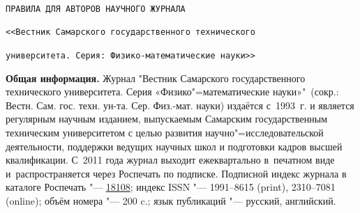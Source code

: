 %
%
%
%


\renewcommand{\firstpage}{192} %
\renewcommand{\lastpage}{196} %


  \rhead[]{\fancyplain{\Vestnik}{}}
  \lhead[\fancyplain{\Vestnik}{}]{}
  \cfoot[]{}
  \lfoot[\thepage]{}
  \rfoot[]{\thepage}
  \plainheadrulewidth=0.7pt
  \headrulewidth=0.4pt

  \pagestyle{fancyplain}

  \thispagestyle{plain}




\renewcommand{\baselinestretch}{0.892}
\normalfont


$\;$
\bigskip

\begin{center}
{\Large \texttt{ПРАВИЛА ДЛЯ АВТОРОВ  НАУЧНОГО ЖУРНАЛА}}

{\Large \texttt{<<Вестник Самарского государственного технического }}

 
{\Large \texttt{университета. Серия: Физико-математические науки>>}}
\end{center}




\textbf {Общая информация.}
Журнал "Вестник Самарского государственного технического университета. Серия «Физико"=математические науки»"\
(сокр.: \linebreak Вестн. Сам. гос. техн. ун-та. Сер. Физ.-мат. науки) издаётся с~1993~г. и является регулярным научным изданием, выпускаемым Самарским государственным техническим университетом с целью развития научно"=исследовательской деятельности, поддержки ведущих научных школ и подготовки кадров высшей квалификации. С~2011 года журнал выходит ежеквартально в~печатном виде и~распространяется через Роспечать по подписке. Подписной индекс журнала в каталоге Роспечать "--- \href{http://www.presscafe.ru/Subs/?RubricID=39&letter=%C2}{18108}; 
индекс ISSN "--- 1991--8615 (print), 2310--7081 (online); объём номера "--- 200 c.; язык публикаций "--- русский, анг\-лийс\-кий. 

